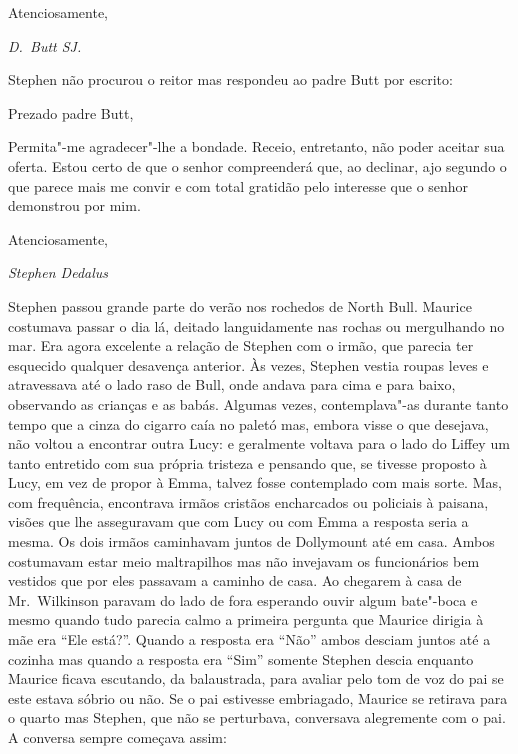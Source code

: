 Atenciosamente,

{\raggedleft\itshape D.~Butt SJ.\par}


\bigskip

Stephen não procurou o reitor mas respondeu ao padre Butt por escrito:


\bigskip

\noindent Prezado padre Butt,\smallskip

Permita"-me agradecer"-lhe a bondade.  Receio, entretanto, não poder
aceitar sua oferta.  Estou certo de que o senhor compreenderá que, ao
declinar, ajo segundo o que parece mais me convir e com total gratidão
pelo interesse que o senhor demonstrou por mim.

Atenciosamente,

{\raggedleft\itshape Stephen Dedalus\par}

\bigskip

Stephen passou grande parte do verão nos rochedos de North Bull. 
Maurice costumava passar o dia lá, deitado languidamente nas rochas ou
mergulhando no mar.  Era agora excelente a relação de Stephen com o
irmão, que parecia ter esquecido qualquer desavença anterior.  Às
vezes, Stephen vestia roupas leves e atravessava até o lado raso de
Bull, onde andava para cima e para baixo, observando as crianças e as
babás.  Algumas vezes, contemplava"-as durante tanto tempo que a cinza
do cigarro caía no paletó mas, embora visse o que desejava, não voltou
a encontrar outra Lucy: e geralmente voltava para o lado do Liffey um
tanto entretido com sua própria tristeza e pensando que, se tivesse
proposto à Lucy, em vez de propor à Emma, talvez fosse contemplado com
mais sorte.  Mas, com frequência, encontrava irmãos cristãos
encharcados ou \label{policiais"-a} policiais à paisana, visões que lhe asseguravam que com
Lucy ou com Emma a resposta seria a mesma.  Os dois irmãos caminhavam
juntos de Dollymount até em casa.  Ambos costumavam estar meio
maltrapilhos mas não invejavam os funcionários bem vestidos que por
eles passavam a caminho de casa.  Ao chegarem à casa de Mr.~Wilkinson
paravam do lado de fora esperando ouvir algum bate"-boca e mesmo quando
tudo parecia calmo a primeira pergunta que Maurice dirigia à mãe era
“Ele está?”.  Quando a resposta era “Não” ambos desciam juntos até a
cozinha mas quando a resposta era “Sim” somente Stephen descia enquanto
Maurice ficava escutando, da balaustrada, para avaliar pelo tom de voz
do pai se este estava sóbrio ou não.  Se o pai estivesse embriagado,
Maurice se retirava para o quarto mas Stephen, que não se perturbava,
conversava alegremente com o pai.  A conversa sempre começava assim:

